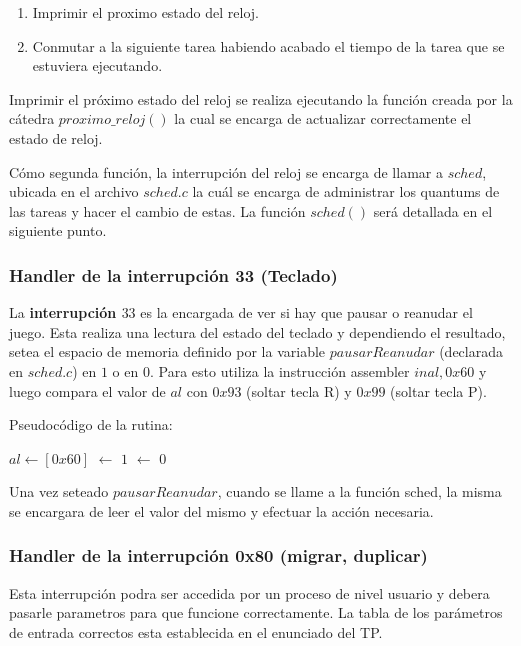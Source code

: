 \documentclass[a4paper,10pt,twoside]{article}
\newenvironment{pseudocodigo}
    {\vspace{0.5em} \begin{algorithmic}}
    {\end{algorithmic} \vspace{0.5em}}
\begin{document}
\begin{enumerate}
 \item Imprimir el proximo estado del reloj.
 \item Conmutar a la siguiente tarea habiendo acabado el tiempo de la tarea que se estuviera ejecutando.
\end{enumerate}

Imprimir el próximo estado del reloj se realiza ejecutando la función creada por la cátedra $proximo\_reloj()$ la cual se encarga de actualizar correctamente el estado de reloj.

Cómo segunda función, la interrupción del reloj se encarga de llamar a $sched$, ubicada en el archivo $sched.c$ la cuál se encarga de administrar los quantums de las tareas y hacer el cambio de estas. La función $sched()$ será detallada en el siguiente punto.

\subsubsection{Handler de la interrupción 33 (Teclado)}

La \textbf{interrupción $33$} es la encargada de ver si hay que pausar o reanudar el juego. Esta realiza una lectura del estado del teclado y dependiendo el resultado, setea el espacio de memoria definido por la variable  $pausarReanudar$ (declarada en $sched.c$) en $1$ o en $0$.
Para esto utiliza la instrucción assembler \textbf{$in al, 0x60$} y luego compara el valor de $al$ con $0x93$ (soltar tecla R) y $0x99$ (soltar tecla P).

Pseudocódigo de la rutina:

\begin{pseudocodigo}
  \STATE $al \leftarrow [0x60]$
    \STATE [$pausarReanudar$] $\leftarrow$ $1$
  \ENDIF
    \STATE [$pausarReanudar$] $\leftarrow$ $0$
  \ENDIF
\end{pseudocodigo}

Una vez seteado $pausarReanudar$, cuando se llame a la función sched, la misma se encargara de leer el valor del mismo y efectuar la acción necesaria.

\subsubsection{Handler de la interrupción 0x80 (migrar, duplicar)}

Esta interrupción podra ser accedida por un proceso de nivel usuario y debera pasarle parametros para que funcione correctamente. La tabla de los parámetros de entrada correctos esta establecida en el enunciado del TP.
\end{document}
